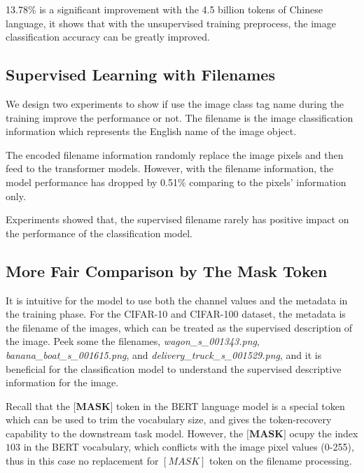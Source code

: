\documentclass[10pt,twocolumn,letterpaper]{article}
\begin{document}
\par 13.78\% is a significant improvement with the 4.5 billion tokens of Chinese language, it shows that with the unsupervised
training preprocess, the image classification accuracy can be greatly improved.

\subsection{Supervised Learning with Filenames}

\par We design two experiments to show if use the image class tag name during the training improve the performance or not.
The filename is the image classification information which represents the English name of the image object.

The encoded filename information randomly replace the image pixels and then feed to the transformer models.
However, with the filename information, the model performance has dropped by 0.51\% comparing to the pixels' information only.

Experiments showed that, the supervised filename rarely has positive impact on the performance of the classification model.

\subsection{More Fair Comparison by The Mask Token}

\par It is intuitive for the model to use both the channel values and the metadata in the training phase.
For the CIFAR-10 and CIFAR-100 dataset, the metadata is the filename of the images, which can be treated as the supervised description of the image.
Peek some the filenames, \eg \textit{wagon\_s\_001343.png}, \textit{banana\_boat\_s\_001615.png}, and \textit{delivery\_truck\_s\_001529.png},
and it is beneficial for the classification model to understand the supervised descriptive information for the image.

\par Recall that the $\textbf{[MASK]}$ token in the BERT language model is a special token which can be used to trim the vocabulary size,
and gives the token-recovery capability to the downstream task model.
However, the $\textbf{[MASK]}$ ocupy the index $103$ in the BERT vocabulary, which conflicts with the image pixel values (0-255), thus in this case no replacement for $[MASK]$ token on the filename processing.
\end{document}
